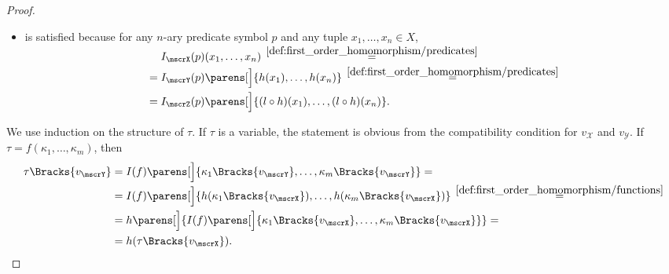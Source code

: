\begin{proof}
\begin{itemize}
    \item {} is satisfied because for any \( n \)-ary predicate symbol \( p \) and any tuple \( x_1, \ldots, x_n \in X \),
    \begin{align*}
      &\phantom{{}={}}
      I_\mscrX(p) (x_1, \ldots, x_n)
      \reloset {\ref{def:first_order_homomorphism/predicates}} = \\ &=
      I_\mscrY(p) \parens[\Big]{ h(x_1), \ldots, h(x_n) }
      \reloset {\ref{def:first_order_homomorphism/predicates}} = \\ &=
      I_{\mscrZ}(p) \parens[\Big]{ (l \bincirc h)(x_1), \ldots, (l \bincirc h)(x_n) }.
    \end{align*}
  \end{itemize}

   We use induction on the structure of \( \tau \). If \( \tau \) is a variable, the statement is obvious from the compatibility condition for \( v_\mscrX \) and \( v_\mscrY \). If \( \tau = f(\kappa_1, \ldots, \kappa_m) \), then
  \begin{align*}
    \tau\Bracks{v_\mscrY}
    &=
    I(f) \parens[\Big]{ \kappa_1\Bracks{v_\mscrY}, \ldots, \kappa_m\Bracks{v_\mscrY} }
    = \\ &=
    I(f) \parens[\Big]{ h(\kappa_1\Bracks{v_\mscrX}), \ldots, h(\kappa_m\Bracks{v_\mscrX}) }
    \reloset {\ref{def:first_order_homomorphism/functions}} = \\ &=
    h\parens[\Big]{ I(f) \parens[\Big]{ \kappa_1\Bracks{v_\mscrX}, \ldots, \kappa_m\Bracks{v_\mscrX} } }
    = \\ &=
    h(\tau\Bracks{v_\mscrX}).
  \end{align*}
\end{proof}

